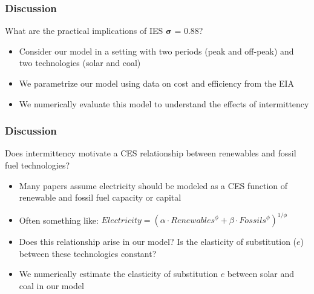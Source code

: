\documentclass[aspectratio=169]{beamer}
\begin{document}
\begin{frame}
\frametitle{Discussion}

\vspace{2em}

\begin{block}{\centering What are the practical implications of IES $\boldsymbol{\sigma}$ = 0.88?}
\end{block}

\vspace{1em}

\begin{itemize}
	\setlength\itemsep{0.5em}
	\item<1-> Consider our model in a setting with two periods (peak and off-peak) and two technologies (solar and coal)
	\item<2-> We parametrize our  model using data on cost and efficiency from the EIA
	\item<3-> We numerically evaluate this model to understand the effects of intermittency
\end{itemize}

\end{frame}


\begin{frame}
\frametitle{Discussion}

\vspace{2em}

\begin{block}{Does intermittency motivate a CES relationship between renewables and fossil fuel technologies? }
	\begin{itemize}
		\setlength\itemsep{0.5em}
		\item<1-> Many papers assume electricity should be modeled as a CES function of renewable and fossil fuel capacity or capital
		\item<1-> Often something like: $Electricity = (\alpha \cdot {Renewables}^\phi + \beta \cdot {Fossils}^\phi)^{1/\phi}$
		\item<2-> Does this relationship arise in our model? Is the elasticity of substitution ($e$) between these technologies constant? 
		\item<2-> We numerically estimate the elasticity of substitution $e$ between solar and coal in our model
	\end{itemize}
\end{block}

\vspace{1em}

\end{frame}
\end{document}
